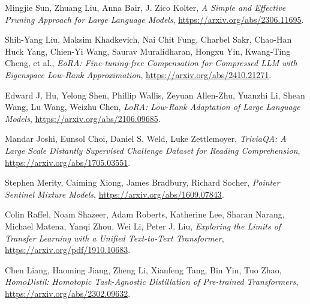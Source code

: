 \begin{thebibliography}{9}
	Mingjie Sun, Zhuang Liu, Anna Bair, J. Zico Kolter,
	\textit{A Simple and Effective Pruning Approach for Large Language Models},
	\url{https://arxiv.org/abs/2306.11695}.

	Shih-Yang Liu, Maksim Khadkevich, Nai Chit Fung, Charbel Sakr, Chao-Han Huck Yang, Chien-Yi Wang, Saurav Muralidharan, Hongxu Yin, Kwang-Ting Cheng, et al.,
	\textit{EoRA: Fine-tuning-free Compensation for Compressed LLM with Eigenspace Low-Rank Approximation},
	\url{https://arxiv.org/abs/2410.21271}.

	Edward J. Hu, Yelong Shen, Phillip Wallis, Zeyuan Allen-Zhu, Yuanzhi Li, Shean Wang, Lu Wang, Weizhu Chen,
	\textit{LoRA: Low-Rank Adaptation of Large Language Models},
	\url{https://arxiv.org/abs/2106.09685}.

	Mandar Joshi, Eunsol Choi, Daniel S. Weld, Luke Zettlemoyer,
	\textit{TriviaQA: A Large Scale Distantly Supervised Challenge Dataset for Reading Comprehension},
	\url{https://arxiv.org/abs/1705.03551}.

	Stephen Merity, Caiming Xiong, James Bradbury, Richard Socher,
	\textit{Pointer Sentinel Mixture Models},
	\url{https://arxiv.org/abs/1609.07843}.

	Colin Raffel, Noam Shazeer, Adam Roberts, Katherine Lee, Sharan Narang, Michael Matena, Yanqi Zhou, Wei Li, Peter J. Liu,	
	\textit{Exploring the Limits of Transfer Learning with a Unified Text-to-Text Transformer},
	\url{https://arxiv.org/pdf/1910.10683}.

	Chen Liang, Haoming Jiang, Zheng Li, Xianfeng Tang, Bin Yin, Tuo Zhao,
	\textit{HomoDistil: Homotopic Task-Agnostic Distillation of Pre-trained Transformers},
	\url{https://arxiv.org/abs/2302.09632}.

\end{thebibliography}